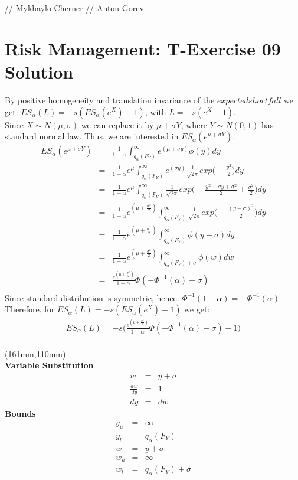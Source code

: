 \documentclass[12pt,a4paper]{article}
\begin{document}
// Mykhaylo Cherner // Anton Gorev
\section*{Risk Management: T-Exercise 09  Solution}
	\justify By positive homogeneity and translation invariance of the $expected shortfall$ we get: 
		  $ES_\alpha(L) = -s(ES_\alpha(e^X)-1)$, with $L=-s(e^X -1)$. \\
		  Since $X \sim N(\mu, \sigma)$ we can replace it by $\mu + \sigma Y$, where $Y \sim N(0, 1)$
		  has standard normal law. Thus, we are interested in $ES_\alpha (e^{\mu + \sigma Y})$.
	\begin{eqnarray*}
		ES_\alpha (e^{\mu + \sigma Y}) &=& \frac{1}{1-\alpha} \int_{q_\alpha(F_Y)}^{\infty} e^{(\mu + \sigma y)} \phi (y) dy \\
		&=& \frac{1}{1-\alpha} e^\mu \int_{q_\alpha(F_Y)}^{\infty} e^{(\sigma y)} \frac{1}{\sqrt{2 \pi}} exp\Big( - \frac{y^2}{2} \Big) dy \\
		&=& \frac{1}{1-\alpha} e^\mu \int_{q_\alpha(F_Y)}^{\infty} \frac{1}{\sqrt{2 \pi}} exp\Big( - \frac{y^2 - \sigma y+ \sigma^2}{2} + \frac{\sigma^2}{2} \Big) dy \\
		&=& \frac{1}{1-\alpha} e^{(\mu + \frac{\sigma^2}{2})}  \int_{q_\alpha(F_Y)}^{\infty} \frac{1}{\sqrt{2 \pi}} exp\Big( - \frac{(y - \sigma)^2}{2} \Big) dy \\
		&=& \frac{1}{1-\alpha} e^{(\mu + \frac{\sigma^2}{2})}  \int_{q_\alpha(F_Y)}^{\infty} \phi (y + \sigma) dy \\
		&=& \frac{1}{1-\alpha} e^{(\mu + \frac{\sigma^2}{2})}  \int_{q_\alpha(F_Y) + \sigma}^{\infty} \phi (w) dw \\
		&=& \frac{e^{(\mu + \frac{\sigma^2}{2})}}{1-\alpha} \Phi ( - \Phi^{-1} (\alpha) - \sigma) \\
	\end{eqnarray*}
	\justify Since standard distribution is symmetric, hence: $\Phi^{-1} (1 - \alpha) = - \Phi^{-1} (\alpha)$ \\
	\justify Therefore, for $ES_\alpha(L) = -s(ES_\alpha(e^X)-1)$ we get:
	\begin{eqnarray*}
		ES_\alpha(L) = -s \Big( \frac{e^{(\mu + \frac{\sigma^2}{2})}}{1-\alpha} \Phi ( - \Phi^{-1} (\alpha) - \sigma) - 1 \Big)\\
	\end{eqnarray*}
\begin{textblock*}{45mm}(161mm,110mm)
\noindent
	\\
  \textbf{Variable Substitution} 
	\begin{eqnarray*}
		w &=& y + \sigma \\
		\frac{dw}{dy} &=& 1 \\
		dy &=& dw
	\end{eqnarray*}
  \textbf{Bounds}
	\begin{eqnarray*}
		y_u &=& \infty \\ 
		y_l &=& q_\alpha(F_Y) \\
		w &=& y + \sigma \\
		w_u &=& \infty \\
		w_l &=& q_\alpha(F_Y) + \sigma
	\end{eqnarray*}
\end{textblock*}
\end{document}
